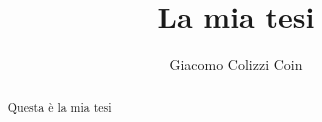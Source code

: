 \documentclass[binding=0.6cm,Lau]{sapthesis}
\title{La mia tesi}
\author{Giacomo Colizzi Coin}
\begin{document}
\frontmatter
\maketitle

\begin{abstract}
Questa è la mia tesi
\end{abstract}

\tableofcontents

\mainmatter





\backmatter
\cleardoublepage
{}
{}
	
\end{document}
